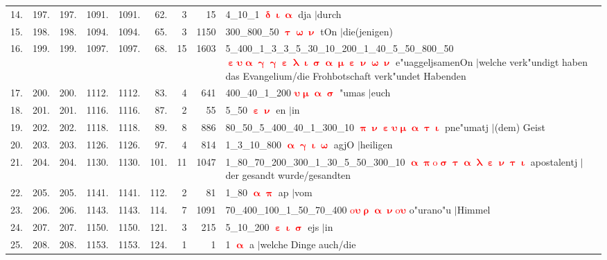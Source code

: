 \documentclass[a4paper,10pt,landscape]{article}
\begin{document}
\begin{tabular}{rrrrrrrrp{120mm}}
14.&197.&197.&1091.&1091.&62.&3&15&4\_10\_1 \textcolor{red}{$\boldsymbol{\updelta\upiota\upalpha}$} dja $|$durch\\
15.&198.&198.&1094.&1094.&65.&3&1150&300\_800\_50 \textcolor{red}{$\boldsymbol{\uptau\upomega\upnu}$} tOn $|$die(jenigen)\\
16.&199.&199.&1097.&1097.&68.&15&1603&5\_400\_1\_3\_3\_5\_30\_10\_200\_1\_40\_5\_50\_800\_50 \textcolor{red}{$\boldsymbol{\upepsilon\upsilon\upalpha\upgamma\upgamma\upepsilon\uplambda\upiota\upsigma\upalpha\upmu\upepsilon\upnu\upomega\upnu}$} e"uaggeljsamenOn $|$welche verk"undigt haben das Evangelium/die Frohbotschaft verk"undet Habenden\\
17.&200.&200.&1112.&1112.&83.&4&641&400\_40\_1\_200 \textcolor{red}{$\boldsymbol{\upsilon\upmu\upalpha\upsigma}$} "umas $|$euch\\
18.&201.&201.&1116.&1116.&87.&2&55&5\_50 \textcolor{red}{$\boldsymbol{\upepsilon\upnu}$} en $|$in\\
19.&202.&202.&1118.&1118.&89.&8&886&80\_50\_5\_400\_40\_1\_300\_10 \textcolor{red}{$\boldsymbol{\uppi\upnu\upepsilon\upsilon\upmu\upalpha\uptau\upiota}$} pne"umatj $|$(dem) Geist\\
20.&203.&203.&1126.&1126.&97.&4&814&1\_3\_10\_800 \textcolor{red}{$\boldsymbol{\upalpha\upgamma\upiota\upomega}$} agjO $|$heiligen\\
21.&204.&204.&1130.&1130.&101.&11&1047&1\_80\_70\_200\_300\_1\_30\_5\_50\_300\_10 \textcolor{red}{$\boldsymbol{\upalpha\uppi\mathrm{o}\upsigma\uptau\upalpha\uplambda\upepsilon\upnu\uptau\upiota}$} apostalentj $|$der gesandt wurde/gesandten\\
22.&205.&205.&1141.&1141.&112.&2&81&1\_80 \textcolor{red}{$\boldsymbol{\upalpha\uppi}$} ap $|$vom\\
23.&206.&206.&1143.&1143.&114.&7&1091&70\_400\_100\_1\_50\_70\_400 \textcolor{red}{$\boldsymbol{\mathrm{o}\upsilon\uprho\upalpha\upnu\mathrm{o}\upsilon}$} o"urano"u $|$Himmel\\
24.&207.&207.&1150.&1150.&121.&3&215&5\_10\_200 \textcolor{red}{$\boldsymbol{\upepsilon\upiota\upsigma}$} ejs $|$in\\
25.&208.&208.&1153.&1153.&124.&1&1&1 \textcolor{red}{$\boldsymbol{\upalpha}$} a $|$welche Dinge auch/die\\
\end{tabular}
\newpage
\end{document}
